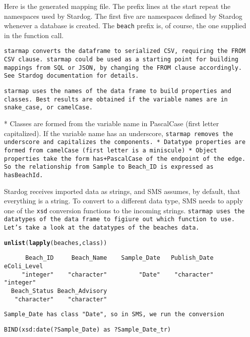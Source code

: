 \documentclass{article}\usepackage[]{graphicx}\usepackage[]{xcolor}
\makeatletter
\newcommand{\hlstd}[1]{\textcolor[rgb]{0.345,0.345,0.345}{#1}}%
\newcommand{\hlkwd}[1]{\textcolor[rgb]{0.737,0.353,0.396}{\textbf{#1}}}%
\newenvironment{kframe}{%
 \def\at@end@of@kframe{}%
 \ifinner\ifhmode%
  \def\at@end@of@kframe{\end{minipage}}%
  \begin{minipage}{\columnwidth}%
 \fi\fi%
 \def\FrameCommand##1{\hskip\@totalleftmargin \hskip-\fboxsep
 \colorbox{shadecolor}{##1}\hskip-\fboxsep
     \hskip-\linewidth \hskip-\@totalleftmargin \hskip\columnwidth}%
 \MakeFramed {\advance\hsize-\width
   \@totalleftmargin\z@ \linewidth\hsize
   \@setminipage}}%
 {\par\unskip\endMakeFramed%
 \at@end@of@kframe}
\newenvironment{knitrout}{}{} %
\makeatother
\begin{document}
Here is the generated mapping file. The prefix lines at the start repeat the namespaces used by Stardog. The first five are namespaces defined by Stardog whenever a database is created. The \texttt{beach} prefix is, of course, the one supplied in the function call.

\tt{starmap} converts the dataframe to serialized CSV, requiring the \texttt{FROM CSV} clause. \tt{starmap} could be used as a starting point for building mappings from SQL or JSON, by changing the \texttt{FROM} clause accordingly. See Stardog documentation for details.

\tt{starmap} uses the names of the data frame to build properties and classes. Best results are obtained if the variable names are in snake\_case, or camelCase.

* Classes are formed from the variable name in PascalCase (first letter capitalized). If the variable name has an underscore, \tt{starmap} removes the underscore and capitalizes the components.
* Datatype properties are formed from camelCase (first letter is a miniscule)
* Object properties take the form has+PascalCase of the endpoint of the edge. So the relationship from \tt{Sample} to \tt{Beach\_ID} is expressed as \tt{hasBeachId}.


Stardog receives imported data as strings, and SMS assumes, by default, that everything is a string. To convert to a different data type, SMS needs to apply one of the \texttt{xsd} conversion functions to the incoming strings. \tt{starmap} uses the datatypes of the data frame to figiure out which function to use. Let's take a look at the datatypes of the beaches data.

\begin{knitrout}
\color{fgcolor}\begin{kframe}
\begin{alltt}
\hlkwd{unlist}\hlstd{(}\hlkwd{lapply}\hlstd{(beaches, class))}
\end{alltt}
\begin{verbatim}
      Beach_ID     Beach_Name    Sample_Date   Publish_Date    eColi_Level 
     "integer"    "character"         "Date"    "character"      "integer" 
  Beach_Status Beach_Advisory 
   "character"    "character" 
\end{verbatim}
\end{kframe}
\end{knitrout}


\tt{Sample\_Date} has class "Date", so in SMS, we run the conversion \begin{verbatim}BIND(xsd:date(?Sample_Date) as ?Sample_Date_tr)\end{verbatim}
\end{document}
